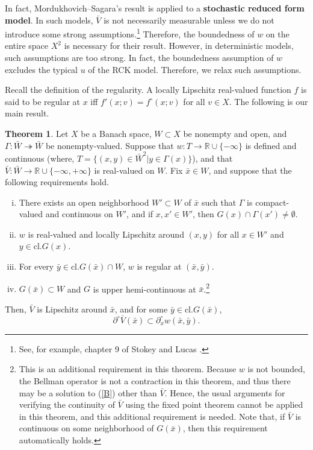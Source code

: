 \documentclass[a4paper,12pt]{article}
\theoremstyle{definition}
\newtheorem{thm}{Theorem}
\begin{document}
In fact, Mordukhovich--Sagara's result is applied to a {\bf stochastic reduced form model}. In such models, $\bar{V}$ is not necessarily measurable unless we do not introduce some strong assumptions.\footnote{See, for example, chapter 9 of Stokey and Lucas \cite{SL}.} Therefore, the boundedness of $w$ on the entire space $X^2$ is necessary for their result. However, in deterministic models, such assumptions are too strong. In fact, the boundedness assumption of $w$ excludes the typical $u$ of the RCK model. Therefore, we relax such assumptions. 

Recall the definition of the regularity. A locally Lipschitz real-valued function $f$ is said to be regular at $x$ iff $f'(x;v)=f^{\circ}(x;v)$ for all $v\in X$. The following is our main result.

\begin{thm}\label{thm3}
Let $X$ be a Banach space, $W\subset X$ be nonempty and open, and $\Gamma:\bar{W}\twoheadrightarrow \bar{W}$ be nonempty-valued. Suppose that $w:T\to \mathbb{R}\cup \{-\infty\}$ is defined and continuous (where, $T=\{(x,y)\in \bar{W}^2|y\in \Gamma(x)\}$), and that $\bar{V}:\bar{W}\to \mathbb{R}\cup \{-\infty,+\infty\}$ is real-valued on $W$. Fix $\bar{x}\in W$, and suppose that the following requirements hold.
\begin{enumerate}[i)]
\item There exists an open neighborhood $W'\subset W$ of $\bar{x}$ such that $\Gamma$ is compact-valued and continuous on $W'$, and if $x,x'\in W'$, then $G(x)\cap \Gamma(x')\neq \emptyset$.

\item $w$ is real-valued and locally Lipschitz around $(x,y)$ for all $x\in W'$ and $y\in \mbox{cl.}G(x)$.

\item For every $\bar{y}\in \mbox{cl.}G(\bar{x})\cap W$, $w$ is regular at $(\bar{x},\bar{y})$.

\item $G(\bar{x})\subset W$ and $G$ is upper hemi-continuous at $\bar{x}$.\footnote{This is an additional requirement in this theorem. Because $w$ is not bounded, the Bellman operator is not a contraction in this theorem, and thus there may be a solution to (\ref{B}) other than $\bar{V}$. Hence, the usual arguments for verifying the continuity of $\bar{V}$ using the fixed point theorem cannot be applied in this theorem, and this additional requirement is needed. Note that, if $\bar{V}$ is continuous on some neighborhood of $G(\bar{x})$, then this requirement automatically holds.}
\end{enumerate}
Then, $\bar{V}$ is Lipschitz around $\bar{x}$, and for some $\bar{y}\in \mbox{cl.}G(\bar{x})$,
\[\partial^{\circ}\bar{V}(\bar{x})\subset \partial^{\circ}_xw(\bar{x},\bar{y}).\]
\end{thm}
\end{document}
